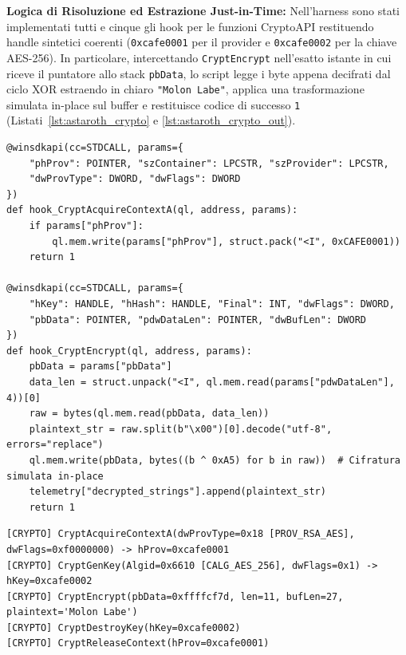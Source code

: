 \documentclass[11pt, a4paper]{article}
\begin{document}
\textbf{Logica di Risoluzione ed Estrazione Just-in-Time:} Nell'harness sono stati implementati tutti e cinque gli hook per le funzioni CryptoAPI restituendo handle sintetici coerenti (\texttt{0xcafe0001} per il provider e \texttt{0xcafe0002} per la chiave AES-256). In particolare, intercettando \texttt{CryptEncrypt} nell'esatto istante in cui riceve il puntatore allo stack \texttt{pbData}, lo script legge i byte appena decifrati dal ciclo XOR estraendo in chiaro \texttt{"Molon Labe"}, applica una trasformazione simulata in-place sul buffer e restituisce codice di successo \texttt{1} (Listati~\ref{lst:astaroth_crypto} e \ref{lst:astaroth_crypto_out}).

\begin{lstlisting}[style=pythoncode, caption={Simulazione del sottosistema Microsoft CryptoAPI ed estrazione in chiaro del buffer decifrato via XOR.}, label={lst:astaroth_crypto}]
@winsdkapi(cc=STDCALL, params={
    "phProv": POINTER, "szContainer": LPCSTR, "szProvider": LPCSTR,
    "dwProvType": DWORD, "dwFlags": DWORD
})
def hook_CryptAcquireContextA(ql, address, params):
    if params["phProv"]:
        ql.mem.write(params["phProv"], struct.pack("<I", 0xCAFE0001))
    return 1

@winsdkapi(cc=STDCALL, params={
    "hKey": HANDLE, "hHash": HANDLE, "Final": INT, "dwFlags": DWORD,
    "pbData": POINTER, "pdwDataLen": POINTER, "dwBufLen": DWORD
})
def hook_CryptEncrypt(ql, address, params):
    pbData = params["pbData"]
    data_len = struct.unpack("<I", ql.mem.read(params["pdwDataLen"], 4))[0]
    raw = bytes(ql.mem.read(pbData, data_len))
    plaintext_str = raw.split(b"\x00")[0].decode("utf-8", errors="replace")
    ql.mem.write(pbData, bytes((b ^ 0xA5) for b in raw))  # Cifratura simulata in-place
    telemetry["decrypted_strings"].append(plaintext_str)
    return 1
\end{lstlisting}


\noindent\begin{minipage}{\linewidth}
\begin{lstlisting}[style=consoleout, caption={Traccia delle chiamate CryptoAPI intercettate e recupero della firma 'Molon Labe'.}, label={lst:astaroth_crypto_out}]
[CRYPTO] CryptAcquireContextA(dwProvType=0x18 [PROV_RSA_AES], dwFlags=0xf0000000) -> hProv=0xcafe0001
[CRYPTO] CryptGenKey(Algid=0x6610 [CALG_AES_256], dwFlags=0x1) -> hKey=0xcafe0002
[CRYPTO] CryptEncrypt(pbData=0xffffcf7d, len=11, bufLen=27, plaintext='Molon Labe')
[CRYPTO] CryptDestroyKey(hKey=0xcafe0002)
[CRYPTO] CryptReleaseContext(hProv=0xcafe0001)
\end{lstlisting}
\end{minipage}
\end{document}
